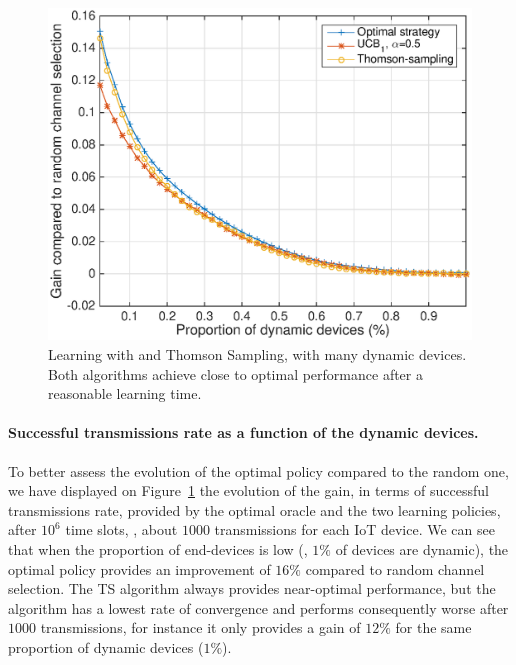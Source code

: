 \begin{figure}[!h]
    \centering
    \includegraphics[scale=0.65]{perf_learning.eps}
    \caption{Learning with \UCB{} and Thomson Sampling, with many dynamic devices. Both algorithms achieve close to optimal performance after a reasonable learning time.}
    \label{fig:41:perf_learning}
\end{figure}


\paragraph{Successful transmissions rate as a function of the dynamic devices.}

To better assess the evolution of the optimal policy compared to the random one, we have displayed on Figure~\ref{fig:41:perf_learning} the evolution of the gain, in terms of successful transmissions rate, provided by the optimal oracle and the two learning policies, after $10^6$ time slots, \ie, about $1000$ transmissions for each IoT device.
We can see that when the proportion of end-devices is low (\eg, $1\%$ of devices are dynamic), the optimal policy provides an improvement of $16\%$ compared to random channel selection.
The TS algorithm always provides near-optimal performance, but the \UCB{} algorithm has a lowest rate of convergence and performs consequently worse after $1000$ transmissions, for instance it only provides a gain of $12\%$ for the same proportion of dynamic devices ($1\%$).


